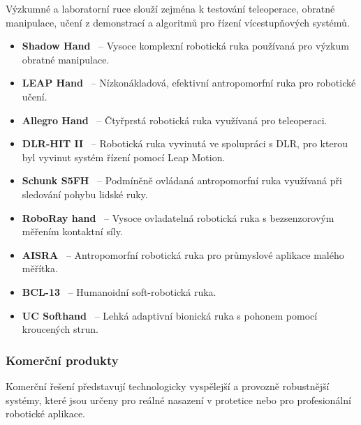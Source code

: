 \documentclass[FZS,DP]{tulthesis}
\begin{document}
Výzkumné a laboratorní ruce slouží zejména k testování teleoperace, obratné manipulace, učení z demonstrací a algoritmů pro řízení vícestupňových systémů.

\begin{itemize}
    \item \textbf{Shadow Hand}~\cite{Thomas2023110,Zhang2025,Mizrahi2023,GIUDICI2025,Belcamino2024} – Vysoce komplexní robotická ruka používaná pro výzkum obratné manipulace.
    \item \textbf{LEAP Hand}~\cite{Zhang2025} – Nízkonákladová, efektivní antropomorfní ruka pro robotické učení.
    \item \textbf{Allegro Hand}~\cite{Thomas2023110,Zhang2025,Mizrahi2023,GIUDICI2025,Li2025} – Čtyřprstá robotická ruka využívaná pro teleoperaci.
    \item \textbf{DLR-HIT II}~\cite{Mizrahi2023} – Robotická ruka vyvinutá ve spolupráci s DLR, pro kterou byl vyvinut systém řízení pomocí Leap Motion.
    \item \textbf{Schunk S5FH}~\cite{Zhang2025,Mizrahi2023,Thomas2023110} – Podmíněně ovládaná antropomorfní ruka využívaná při sledování pohybu lidské ruky.
    \item \textbf{RoboRay hand}~\cite{Devaraja20201222} – Vysoce ovladatelná robotická ruka s bezsenzorovým měřením kontaktní síly.
    \item \textbf{AISRA}~\cite{Devaraja20201222} – Antropomorfní robotická ruka pro průmyslové aplikace malého měřítka.
    \item \textbf{BCL-13}~\cite{Devaraja20201222} – Humanoidní soft-robotická ruka.
    \item \textbf{UC Softhand}~\cite{Koprnicky2017eng} – Lehká adaptivní bionická ruka s pohonem pomocí kroucených strun.
\end{itemize}

\subsubsection{Komerční produkty}

Komerční řešení představují technologicky vyspělejší a provozně robustnější systémy, které jsou určeny pro reálné nasazení v protetice nebo pro profesionální robotické aplikace.
\end{document}
